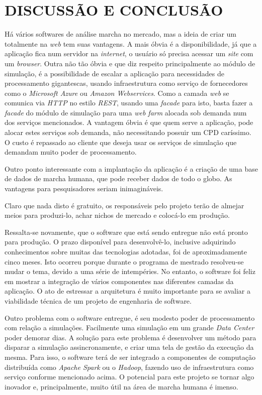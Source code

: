 \chapter[DISCUSSÃO E CONCLUSÃO]{\textbf{DISCUSSÃO E CONCLUSÃO}}

Há vários softwares de análise marcha no mercado, mas a ideia de criar um totalmente na \emph{web} tem suas vantagens. 
A mais óbvia é a disponibilidade, já que a aplicação fica num servidor na \emph{internet}, o usuário só precisa acessar um \emph{site} com um \emph{browser}. 
Outra não tão óbvia e que diz respeito principalmente ao módulo de simulação, é a possibilidade de escalar a aplicação para necessidades de processamento gigantescas, usando infraestrutura como serviço de fornecedores como o \emph{Microsoft Azure} ou \emph{Amazon Webservices}.
Como a camada \emph{web} se comunica via \emph{HTTP} no estilo \emph{REST}, usando uma \emph{facade} para isto, basta fazer a \emph{facade} do módulo de simulação para uma \emph{web farm} alocada sob demanda num dos serviços mencionados. 
A vantagem óbvia é que quem serve a aplicação, pode alocar estes serviços sob demanda, não necessitando possuir um CPD caríssimo. O custo é repassado ao cliente que deseja usar os serviços de simulação que demandam muito poder de processamento.

Outro ponto interessante com a implantação da aplicação é a criação de uma base de dados de marcha humana, que pode receber dados de todo o globo. 
As vantagens para pesquisadores seriam inimagináveis.

Claro que nada disto é gratuito, os responsáveis pelo projeto terão de almejar meios para produzi-lo, achar nichos de mercado e colocá-lo em produção.

Ressalta-se novamente, que o software que está sendo entregue não está pronto para produção. O prazo disponível para desenvolvê-lo, inclusive adquirindo conhecimentos sobre muitas das tecnologias adotadas, foi de aproximadamente cinco meses. 
Isto ocorreu porque durante o programa de mestrado resolveu-se mudar o tema, devido a uma série de intempéries. No entanto, o software foi feliz em mostrar a integração de vários componentes nas diferentes camadas da aplicação. O ato de estressar a arquitetura é muito importante para se avaliar a viabilidade técnica de um projeto de engenharia de software.

Outro problema com o software entregue, é seu modesto poder de processamento com relação a simulações. 
Facilmente uma simulação em um grande \emph{Data Center} poder demorar dias. 
A solução para este problema é desenvolver um método para disparar a simulação assincronamente, e criar uma tela de gestão da execução da mesma. 
Para isso, o software terá de ser integrado a componentes de computação distribuída como \emph{Apache Spark} ou o \emph{Hadoop}, fazendo uso de infraestrutura como serviço conforme mencionado acima. 
O potencial para este projeto se tornar algo inovador e, principalmente, muito útil na área de marcha humana é imenso.

